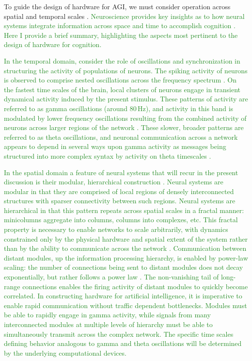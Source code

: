 \documentclass[twocolumn]{article}
\begin{document}
To guide the design of hardware for AGI, we must consider operation across spatial and temporal scales \cite{beba2017,khma2018}. \textcolor{ForestGreen}{Neuroscience provides key insights as to how neural systems integrate information across space and time to accomplish cognition \cite{bu2006,baga2011}. Here I provide a brief summary, highlighting the aspects most pertinent to the design of hardware for cognition.} 

\textcolor{ForestGreen}{In the temporal domain, consider the role of oscillations and synchronization \cite{bu2006} in structuring the activity of populations of neurons. The spiking activity of neurons is observed to comprise nested oscillations across the frequency spectrum \cite{budr2004,bu2006}. On the fastest time scales of the brain, local clusters of neurons engage in transient dynamical activity induced by the present stimulus. These patterns of activity are referred to as gamma oscillations (around 80\,Hz), and activity in this band is modulated by lower frequency oscillations \cite{caed2006,jeco2007} resulting from the combined activity of neurons across larger regions of the network \cite{stsa2000}. These slower, broader patterns are referred to as theta oscillations, and neuronal communication across a network appears to depend in several ways upon gamma activity as messages being structured into more complex syntax by activity on theta timescales \cite{fr2015,bu2019}.}

\textcolor{ForestGreen}{In the spatial domain a feature of neural systems that will recur in the present discussion is their modular, hierarchical construction \cite{mela2010,beba2017,khma2018}. Neural systems are modular in that they are comprised of local regions of densely interconnected structures with sparser connectivity between such regions. Neural systems are hierarchical in that this pattern repeats across spatial scales in a fractal manner: minicolumns aggregate into columns, columns into complexes, etc. This fractal property is necessary to enable networks to scale arbitrarily, with dynamics constrained only by the physical hardware and spatial extent of the system rather than by the ability to communicate across the network \cite{plth2006}. Communication between distant modules, up the information processing hierarchy, is enabled by power-law scaling: the number of connections being sent to distant modules does not decay exponentially, but rather follows a power law \cite{bagr2010,spte2016}. The non-vanishing tail of long-range connections enables the firing activity of distant modules to quickly become correlated. In constructing hardware for artificial intelligence, it is imperative to enable rapid communication without traffic dependent bottlenecks. Modules must be able to rapidly engage in gamma activity, while signals from many interconnected modules at multiple levels of hierarchy must be able to simultaneously transmit across the complex network. The specific time scales defining behavior analogous to gamma and theta oscillations will be determined by the underlying computational devices.}
\end{document}
